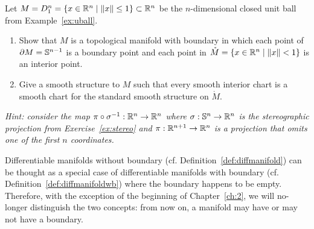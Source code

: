 \begin{exercise}
	Let $M = D_1^n = \{ x\in\mathbb{R}^n \mid \|x\|\leq 1\} \subset \mathbb{R}^n$ be the $n$-dimensional closed unit ball from Example~\ref{ex:uball}.
	\begin{enumerate}
		\item Show that $M$ is a topological manifold with boundary in which each point of $\partial M = \mathbb{S}^{n-1}$ is a boundary point and each point in $\mathring M = \{x\in\mathbb{R}^n\mid\|x\|<1\}$ is an interior point.
		\item Give a smooth structure to $M$ such that every smooth interior chart is a smooth chart for the standard smooth structure on $\mathring M$.
	\end{enumerate}
	\textit{\small Hint: consider the map $\pi\circ\sigma^{-1}:\mathbb{R}^n\to\mathbb{R}^n$ where $\sigma:\mathbb{S}^n\to\mathbb{R}^n$ is the stereographic projection from Exercise~\ref{ex:stereo} and $\pi:\mathbb{R}^{n+1}\to\mathbb{R}^n$ is a projection that omits one of the first $n$ coordinates.}
\end{exercise}

\begin{tcolorbox}
	Differentiable manifolds without boundary (cf. Definition~\ref{def:diffmanifold}) can be thought as a special case of differentiable manifolds with boundary (cf. Definition~\ref{def:diffmanifoldwb}) where the boundary happens to be empty.
	Therefore, with the exception of the beginning of Chapter~\ref{ch:2}, we will no-longer distinguish the two concepts: from now on, a manifold may have or may not have a boundary.
\end{tcolorbox}
